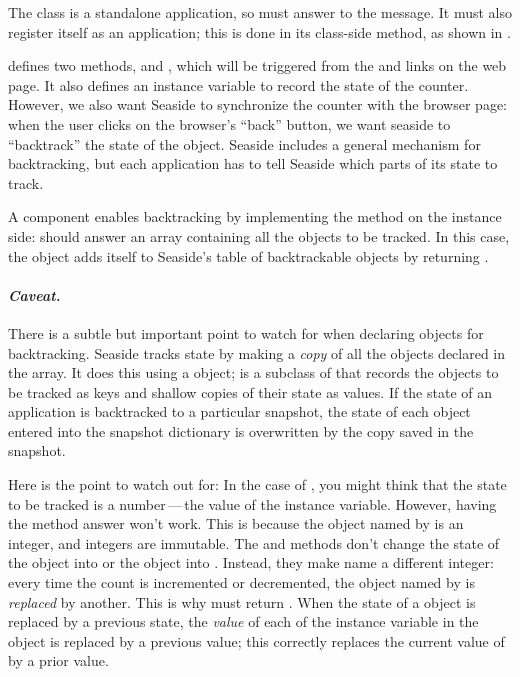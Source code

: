 \documentclass[a4paper,10pt,twoside]{book}
\begin{document}
The class  is a standalone application, so  must answer  to the   message.
It must also register itself as an application; this is done in its class-side  method, as shown in .

 defines two methods,  and , which will be triggered from the \link{++} and \link{--\,--} links on the web page.  
It also defines an instance variable  to record the state of the counter.
However, we also want Seaside to synchronize the counter with the browser page:
when the user clicks on the browser's ``back'' button, we want seaside to ``backtrack'' the state of the  object.
Seaside includes a general mechanism for backtracking, but each application has to tell Seaside which parts of its state to track.  

A component enables backtracking by implementing the  method on the instance side: 
 should answer an array containing all the objects to be tracked.
In this case, the  object adds itself to Seaside's table of backtrackable objects by returning .

\paragraph{\emph{Caveat.}}
There is a subtle but important point to watch for when declaring objects for backtracking.
Seaside tracks state by making a \emph{copy} of all the objects declared in the  array.
It does this using a  object;  is a subclass of  that records the objects to be tracked as keys and shallow copies of their state as values.
If the state of an application is backtracked to a particular snapshot, the state of each object entered into the snapshot dictionary is overwritten by the copy saved in the snapshot.

Here is the point to watch out for:
In the case of , you might think that the state to be tracked is a number\,---\,the value of the  instance variable.
However, having the  method answer  won't work.  
This is because the object named by  is an integer, and integers are immutable.
The  and  methods don't change the state of the object  into  or the object  into .
Instead, they make  name a different integer: 
every time the count is incremented or decremented, the object named by  is \emph{replaced} by another.
This is why  must return .
When the state of a \mbox{} object is replaced by a previous state, the \emph{value} of each of the instance variable in the object is replaced by a previous value; this correctly replaces the current value of  by a prior value. 
\end{document}

